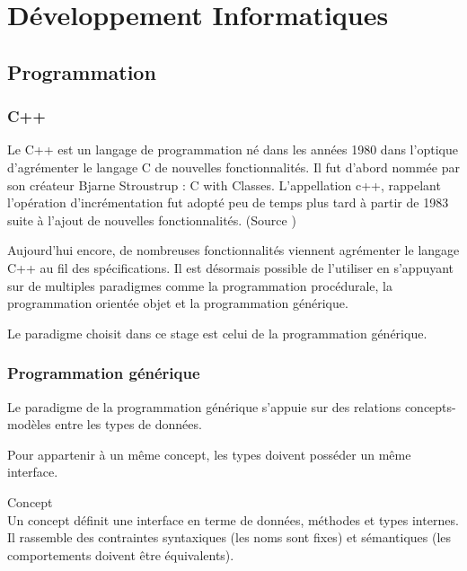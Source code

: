 \section{Développement Informatiques}

\subsection{Programmation}

\subsubsection{C++}

Le C++ est un langage de programmation né dans les années 1980 dans l'optique d'agrémenter le langage C de nouvelles fonctionnalités. Il fut d'abord nommée par son créateur Bjarne Stroustrup : C with Classes. L’appellation c++, rappelant l'opération d'incrémentation fut adopté peu de temps plus tard à partir de 1983 suite à l'ajout de nouvelles fonctionnalités. (Source \cite{Wiki-cpp})

Aujourd'hui encore, de nombreuses fonctionnalités viennent agrémenter le langage C++ au fil des spécifications. Il est désormais possible de l'utiliser en s'appuyant sur de multiples paradigmes comme la programmation procédurale, la programmation orientée objet et la programmation générique.

Le paradigme choisit dans ce stage est celui de la programmation générique. \cite{troussil-cpp}

\subsubsection{Programmation générique}


Le paradigme de la programmation générique s'appuie sur des relations concepts-modèles entre les types de données.  

Pour appartenir à un même concept, les types doivent posséder un même interface. 

\begin{Definition}{Concept}\\
\label{def:cpp-con}
    Un concept définit une interface en terme de données, méthodes et types internes. Il rassemble des contraintes syntaxiques (les noms sont fixes) et sémantiques (les comportements doivent être équivalents). 
\end{Definition}

